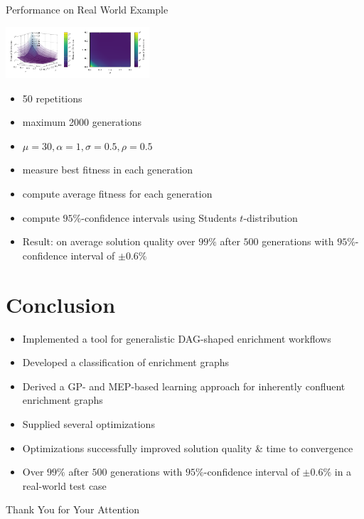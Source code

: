 \documentclass[aspectratio=1610,table]{beamer}
\begin{document}
\begin{frame}{Performance on Real World Example}
\begin{multicols}{2}
  \begin{center}
    \includegraphics[page=4, width=0.4\textwidth]{gfx/graphs}
\end{center}  
\begin{itemize}[<+->]
  \item 50 repetitions
  \item maximum 2000 generations
  \item $\mu=30, \alpha=1, \sigma=0.5, \rho=0.5$
  \item measure best fitness in each generation
  \item compute average fitness for each generation
  \item compute $95\%$-confidence intervals using Students $t$-distribution
  \item Result: on average solution quality over $99\%$ after $500$ generations with $95\%$-confidence interval of $\pm 0.6\%$
\end{itemize}
\end{multicols}
\end{frame}

\section{Conclusion}

\begin{frame}
\begin{itemize}[<+->]
  \item Implemented a tool for generalistic DAG-shaped enrichment workflows
  \item Developed a classification of enrichment graphs
  \item Derived a GP- and MEP-based learning approach for inherently confluent enrichment graphs
  \item Supplied several optimizations
  \item Optimizations successfully improved solution quality \& time to convergence
  \item Over $99\%$ after $500$ generations with $95\%$-confidence interval of $\pm 0.6\%$ in a real-world test case
\end{itemize}  
\end{frame}

\begin{frame}{Thank You for Your Attention}

\end{frame}
\end{document}
